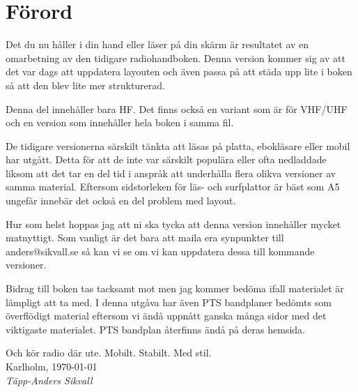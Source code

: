 \section*{Förord}

Det du nu håller i din hand eller läser på din skärm är resultatet av en
omarbetning av den tidigare radiohandboken. Denna version kommer sig av att det
var dags att uppdatera layouten och även passa på att städa upp lite i boken så
att den blev lite mer strukturerad.

Denna del innehåller bara HF. Det finns också en variant som är för VHF/UHF och
en version som innehåller hela boken i samma fil.

De tidigare versionerna särskilt tänkta att läsas på platta, ebokläsare eller
mobil har utgått. Detta för att de inte var särskilt populära eller ofta
nedladdade liksom att det tar en del tid i anspråk att underhålla flera olikva
versioner av samma material. Eftersom sidstorleken för läs- och surfplattor är
bäst som A5 ungefär innebär det också en del problem med layout.

Hur som helst hoppas jag att ni ska tycka att denna version innehåller mycket
matnyttigt. Som vanligt är det bara att maila era synpunkter till
anders@sikvall.se så kan vi se om vi kan uppdatera dessa till kommande
versioner.

Bidrag till boken tas tacksamt mot men jag kommer bedöma ifall materialet är
lämpligt att ta med. I denna utgåva har även PTS bandplaner bedömts som
överflödigt material eftersom vi ändå uppnått ganska många sidor med det
viktigaste materialet. PTS bandplan återfinns ändå på deras hemsida.

Och kör radio där ute. Mobilt. Stabilt. Med stil.\\[4em]

Karlholm, \today\\
\textit{Täpp-Anders Sikvall}

\clearpage
